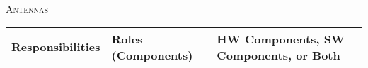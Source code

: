 \documentclass[RRC.tex]{subfiles}
\begin{document}
\bigskip

\begin{center}
	\textsc{\Large Antennas}
	\hrulefill
	\begin{tabular}{ | p{5cm} | p{5cm} | p{5cm} |}
		\hline
		Responsibilities & Roles (Components) & HW Components, SW Components, or Both \\ \hline
		
	\end{tabular}
\end{center}
\end{document}
